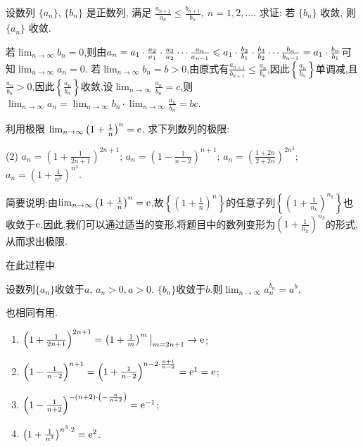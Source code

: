 \begin{exercise}[1.2.21]
    设数列 $\{a_n\}$, $\{b_n\}$ 是正数列, 满足 $\frac{a_{n+1}}{a_n} \le \frac{b_{n+1}}{b_n}, \ n=1, 2, \ldots$. 求证: 若 $\{b_n\}$ 收敛, 则 $\{a_n\}$ 收敛.
\end{exercise}

\begin{solution}
    若$\lim_{n\to\infty} b_n = 0$,则由$a_n = a_1 \cdot \frac{a_2}{a_1} \cdot \frac{a_3}{a_2} \cdots \frac{a_n}{a_{n-1}} \leqslant a_1 \cdot \frac{b_2}{b_1} \cdot \frac{b_3}{b_2} \cdots \frac{b_n}{b_{n-1}} = a_1 \cdot \frac{b_n}{b_1}$可知$\lim_{n\to\infty} a_n = 0$.
    若$\lim_{n\to\infty} b_n = b > 0$,由原式有$\frac{a_{n+1}}{b_{n+1}} \le \frac{a_n}{b_n}$,因此$\left\{ \frac{a_n}{b_n} \right\}$单调减,且$\frac{a_n}{b_n} > 0$,因此$\left\{ \frac{a_n}{b_n} \right\}$收敛,设$\lim_{n\to\infty} \frac{a_n}{b_n} = c$,则$\lim_{n\to\infty} a_n = \lim_{n\to\infty} b_n \cdot \lim_{n\to\infty} \frac{a_n}{b_n} = bc$.
\end{solution}

\begin{exercise}[1.2.22]
    利用极限 $\lim_{n\to\infty} \left(1 + \frac{1}{n}\right)^n = \mathrm{e}$, 求下列数列的极限:
    \begin{tasks}[label=(\arabic*)](2)
        \task $a_n = \left(1 + \frac{1}{2n+1}\right)^{2n+1}$;
        \task $a_n = \left(1 - \frac{1}{n-2}\right)^{n+1}$;
        \task $a_n = \left(\frac{1+2n}{2+2n}\right)^{2n^3}$;
        \task $a_n = \left(1 + \frac{1}{n^3}\right)^{n^3}$.
    \end{tasks}
\end{exercise}

简要说明:由$\lim_{n\to\infty} \left(1 + \frac{1}{n}\right)^n = \mathrm{e}$,故$\left\{ \left(1 + \frac{1}{n}\right)^n \right\}$的任意子列$\left\{ \left(1 + \frac{1}{n_k}\right)^{n_k} \right\}$也收敛于$\mathrm{e}$.因此,我们可以通过适当的变形,将题目中的数列变形为$\left(1 + \frac{1}{n_k}\right)^{n_k}$的形式,从而求出极限.

在此过程中
\begin{proposition*}
    设数列$\{a_n\}$收敛于$a$, $a_n > 0, a > 0$. $\{b_n\}$收敛于$b$.则$\lim_{n \to \infty} a_n^{b_n} = a^b$.
\end{proposition*}
也相同有用.

\begin{solution}
    \begin{enumerate}[(1)]
        \item $\left(1 + \frac{1}{2n+1}\right)^{2n+1} = \left(1 + \frac{1}{m}\right)^m \big|_{m=2n+1} \to \mathrm{e}$;
        \item $\left(1 - \frac{1}{n-2}\right)^{n+1} = \left(1 + \frac{1}{n-2}\right)^{{n-2} \cdot \frac{n+1}{n-2}} = \mathrm{e}^1 = \mathrm{e}$;
        \item $\left(1 - \frac{1}{n+2} \right)^{-{(n+2)} \cdot \left( - \frac{n}{n+2} \right)} = \mathrm{e}^{-1}$;
        \item $\left(1 + \frac{1}{n^3}\right)^{n^3 \cdot 2} = \mathrm{e}^2$.
    \end{enumerate}
\end{solution}


